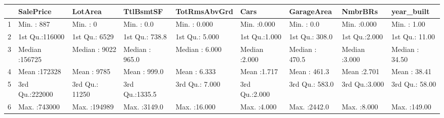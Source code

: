 \begin{table}[ht]
\centering
\begin{tabular}{rllllllll}
  \hline
 &   SalePrice &    LotArea &   TtlBsmtSF &  TotRmsAbvGrd &      Cars &   GarageArea &    NmbrBRs &   year\_built \\ 
  \hline
1 & Min.   :   887   & Min.   :     0   & Min.   :   0.0   & Min.   : 0.000   & Min.   :0.000   & Min.   :   0.0   & Min.   :0.000   & Min.   :  1.00   \\ 
  2 & 1st Qu.:116000   & 1st Qu.:  6529   & 1st Qu.: 738.8   & 1st Qu.: 5.000   & 1st Qu.:1.000   & 1st Qu.: 308.0   & 1st Qu.:2.000   & 1st Qu.: 11.00   \\ 
  3 & Median :156725   & Median :  9022   & Median : 965.0   & Median : 6.000   & Median :2.000   & Median : 470.5   & Median :3.000   & Median : 34.50   \\ 
  4 & Mean   :172328   & Mean   :  9785   & Mean   : 999.0   & Mean   : 6.333   & Mean   :1.717   & Mean   : 461.3   & Mean   :2.701   & Mean   : 38.41   \\ 
  5 & 3rd Qu.:222000   & 3rd Qu.: 11250   & 3rd Qu.:1335.5   & 3rd Qu.: 7.000   & 3rd Qu.:2.000   & 3rd Qu.: 583.0   & 3rd Qu.:3.000   & 3rd Qu.: 58.00   \\ 
  6 & Max.   :743000   & Max.   :194989   & Max.   :3149.0   & Max.   :16.000   & Max.   :4.000   & Max.   :2442.0   & Max.   :8.000   & Max.   :149.00   \\ 
   \hline
\end{tabular}
\end{table}
